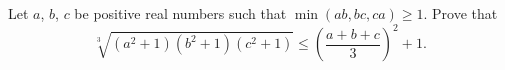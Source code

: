 Let 
$a$, 
$b$, 
$c$
 be positive real numbers such that 
$\min(ab,bc,ca) \ge 1$. 
 Prove that 
$$\sqrt[3]{(a^2+1)(b^2+1)(c^2+1)} \le \left(\frac{a+b+c}{3}\right)^2 + 1.$$
